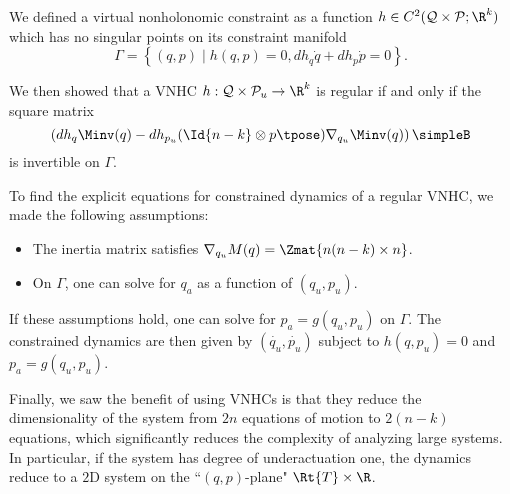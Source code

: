 We defined a virtual nonholonomic
constraint as a function 
\(h \in C^2(\mathcal{Q}\times\mathcal{P}; \R^k)\) 
which has no singular points on its constraint manifold
\[
    \Gamma = \left\{(q,p) \mid h(q,p) = 0, dh_q \dot{q} + dh_p \dot{p} = 0\right\}
    .
\]

We then showed that a VNHC 
\(h : \mathcal{Q} \times \mathcal{P}_u \rightarrow \R^k\) is regular if and only
if the square matrix
\[
    \left(
    dh_q \Minv(q) - 
    dh_{p_u} (\Id{n-k} \otimes p\tpose)\nabla_{q_u}\Minv(q) 
    \right)
    \simpleB
\]
is invertible on \(\Gamma\).

To find the explicit equations for constrained dynamics of a regular VNHC, 
we made the following assumptions:
\begin{itemize}
    \item The inertia matrix satisfies 
        \(\nabla_{q_u}M(q) = \Zmat{n(n-k) \times n}\).
    \item On \(\Gamma\), one can solve for \(q_a\) as a function of
        \((q_u,p_u)\).
\end{itemize}
If these assumptions hold, one can solve for \(p_a = g(q_u,p_u)\) on \(\Gamma\).
The constrained dynamics are then given by
\((\dot{q_u}, \dot{p_u})\) subject to \(h(q,p_u) = 0\) and \(p_a = g(q_u,p_u)\).

Finally, we saw the benefit of using VNHCs is that they reduce the
dimensionality of the system from \(2n\) equations of motion to \(2(n-k)\)
equations, which significantly reduces the complexity of analyzing large systems.
In particular, if the system has degree of underactuation one, the dynamics
reduce to a \(2\)D system on the ``\((q,p)\)-plane" \(\Rt{T}\times\R\).

